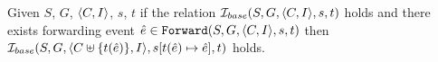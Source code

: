 \documentclass[12pt]{article}
\begin{document}

\begin{lemma}
  \label{lemma:sim-forward}
  Given $S$, $G$, $\langle C, I \rangle$, $s$, $t$
  if the relation $\mathcal{I}_{base}(S, G, \langle C, I \rangle, s, t)$ holds and 
  there exists forwarding event $\hat{e} \in {\mathtt{Forward}}(S, G, \langle C, I \rangle, s, t)$
  then $\mathcal{I}_{base}(S, G, \langle C \uplus \{t(\hat{e})\}, I \rangle, s[t(\hat{e}) \mapsto \hat{e}], t)$ holds. 
\end{lemma}
\end{document}
